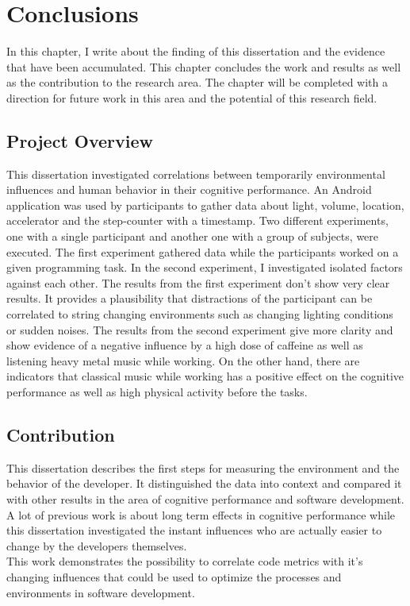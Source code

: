 \chapter{Conclusions}
In this chapter, I write about the finding of this dissertation and the evidence that have been accumulated. This chapter concludes the work and results as well as the contribution to the research area. 
The chapter will be completed with a direction for future work in this area and the potential of this research field. 

\section{Project Overview}
This dissertation investigated correlations between temporarily environmental influences and human behavior in their cognitive performance. 
An Android application was used by participants to gather data about light, volume, location, accelerator and the step-counter with a timestamp.  
Two different experiments, one with a single participant and another one with a group of subjects, were executed. The first experiment gathered data while the participants worked on a given programming task. In the second experiment, I investigated isolated factors against each other.
The results from the first experiment don't show very clear results. It provides a plausibility that distractions of the participant can be correlated to string changing environments such as changing lighting conditions or sudden noises. 
The results from the second experiment give more clarity and show evidence of a negative influence by a high dose of caffeine as well as listening heavy metal music while working. On the other hand, there are indicators that classical music while working has a positive effect on the cognitive performance  as well as high physical activity before the tasks. 

\section{Contribution}
This dissertation describes the first steps for measuring the environment and the behavior of the developer. It distinguished the data into context and compared it with other results in the area of cognitive performance and software development. A lot of previous work is about long term effects in cognitive performance while this dissertation investigated the instant influences who are actually easier to change by the developers themselves. \\
This work demonstrates the possibility to correlate code metrics with it's changing influences that could be used to optimize the processes and environments in software development. 

